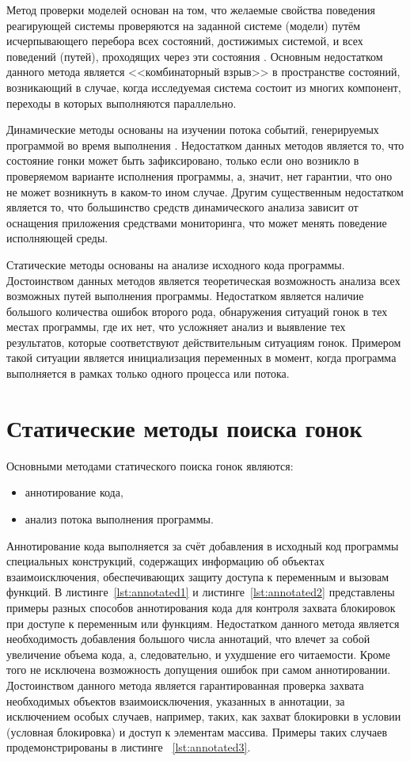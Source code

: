 Метод проверки моделей основан на том, что желаемые свойства поведения реагирующей системы проверяются на заданной системе (модели) путём исчерпывающего перебора всех состояний, достижимых системой, и всех поведений (путей), проходящих через эти состояния \cite{Peled}. Основным недостатком данного метода является <<комбинаторный взрыв>> в пространстве состояний, возникающий в случае, когда исследуемая система состоит из многих компонент, переходы в которых выполняются параллельно.

Динамические методы основаны на изучении потока событий, генерируемых программой во время выполнения \cite{Kovega}. Недостатком данных методов является то, что состояние гонки может быть зафиксировано, только если оно возникло в проверяемом  варианте исполнения программы, а, значит, нет гарантии, что оно не может возникнуть в каком-то ином случае. Другим существенным недостатком является то, что большинство средств динамического анализа зависит от оснащения приложения средствами мониторинга, что может менять поведение исполняющей среды.

Статические методы основаны на анализе исходного кода программы. Достоинством данных методов является теоретическая возможность анализа всех возможных путей выполнения программы. Недостатком является наличие большого количества ошибок второго рода,  обнаружения ситуаций гонок в тех местах программы, где их нет, что усложняет анализ и выявление тех результатов, которые соответствуют действительным ситуациям гонок. Примером такой ситуации является инициализация переменных в момент, когда программа выполняется в рамках только одного процесса или потока.

\section{Статические методы поиска гонок}

Основными методами статического поиска гонок являются:

\begin{itemize}
  \item аннотирование кода,
  \item анализ потока выполнения программы.
\end{itemize}

Аннотирование кода выполняется за счёт добавления в исходный код программы специальных конструкций, содержащих информацию об объектах взаимоисключения, обеспечивающих защиту доступа к переменным и вызовам функций. В листинге~\ref{lst:annotated1} и листинге~\ref{lst:annotated2} представлены примеры разных способов аннотирования кода для контроля захвата блокировок при доступе к переменным или функциям. Недостатком данного метода является необходимость добавления большого числа аннотаций, что влечет за собой увеличение объема кода, а, следовательно, и ухудшение его читаемости. Кроме того не исключена возможность допущения ошибок при самом аннотировании. Достоинством данного метода является гарантированная проверка захвата необходимых объектов взаимоисключения, указанных в аннотации, за исключением особых случаев, например, таких, как захват блокировки в условии (условная блокировка) и доступ к элементам массива. Примеры таких случаев продемонстрированы в листинге ~\ref{lst:annotated3}.

